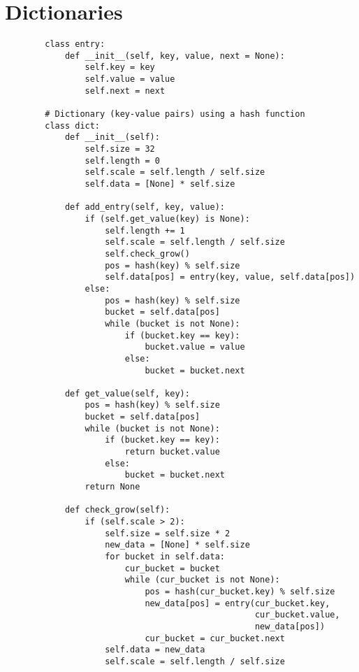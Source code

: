 \newpage

\section[Day 4: Dictionaries]{ Dictionaries }

    \begin{lstlisting}
        class entry:
            def __init__(self, key, value, next = None):
                self.key = key
                self.value = value
                self.next = next
                
        # Dictionary (key-value pairs) using a hash function
        class dict:
            def __init__(self):
                self.size = 32
                self.length = 0
                self.scale = self.length / self.size
                self.data = [None] * self.size

            def add_entry(self, key, value):
                if (self.get_value(key) is None):
                    self.length += 1
                    self.scale = self.length / self.size
                    self.check_grow()
                    pos = hash(key) % self.size
                    self.data[pos] = entry(key, value, self.data[pos])
                else:
                    pos = hash(key) % self.size
                    bucket = self.data[pos]
                    while (bucket is not None):
                        if (bucket.key == key):
                            bucket.value = value
                        else:
                            bucket = bucket.next

            def get_value(self, key):
                pos = hash(key) % self.size
                bucket = self.data[pos]
                while (bucket is not None):
                    if (bucket.key == key):
                        return bucket.value
                    else:
                        bucket = bucket.next
                return None
            
            def check_grow(self):
                if (self.scale > 2):
                    self.size = self.size * 2
                    new_data = [None] * self.size
                    for bucket in self.data:
                        cur_bucket = bucket
                        while (cur_bucket is not None):
                            pos = hash(cur_bucket.key) % self.size
                            new_data[pos] = entry(cur_bucket.key,
                                                  cur_bucket.value,
                                                  new_data[pos])
                            cur_bucket = cur_bucket.next
                    self.data = new_data
                    self.scale = self.length / self.size
    \end{lstlisting}






























